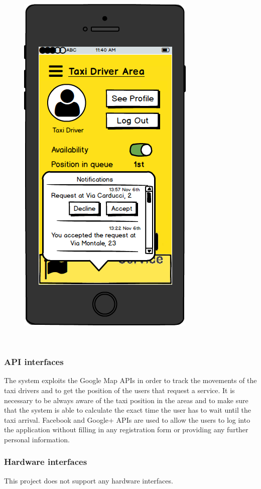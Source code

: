 \documentclass[18pt,oneside,a4paper, titlepage]{article}
\begin{document}
\begin{itemize}
				\begin{figure}[h]
					\centering
					\includegraphics[scale=0.3]{Mockups/MobileAppTaxiDriverNotifications.png}
				\end{figure}
				\\
			\end{itemize}
\newpage
		\subsubsection{API interfaces}
			The system exploits the Google Map APIs in order to track the movements of the taxi drivers and to get the position of the users that request a service. It is necessary to be always aware of the taxi position in the areas and to make sure that the system is able to calculate the exact time the user has to wait until the taxi arrival. 
			Facebook and Google+ APIs are used to allow the users to log into the application without filling in any registration form or providing any further personal information.
			
		\subsubsection{Hardware interfaces}
			This project does not support any hardware interfaces.
\end{document}
